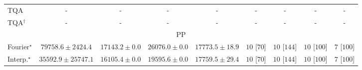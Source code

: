 \begin{tabular}{l|cccc|cccc|}
TQA & {\cellcolor[HTML]{000000}} \color[HTML]{F1F1F1} {\cellcolor{white}} \color{black} - & {\cellcolor[HTML]{000000}} \color[HTML]{F1F1F1} {\cellcolor{white}} \color{black} - & {\cellcolor[HTML]{000000}} \color[HTML]{F1F1F1} {\cellcolor{white}} \color{black} - & {\cellcolor[HTML]{000000}} \color[HTML]{F1F1F1} {\cellcolor{white}} \color{black} - & {\cellcolor[HTML]{000000}} \color[HTML]{F1F1F1} {\cellcolor{white}} \color{black} - & {\cellcolor[HTML]{000000}} \color[HTML]{F1F1F1} {\cellcolor{white}} \color{black} - & {\cellcolor[HTML]{000000}} \color[HTML]{F1F1F1} {\cellcolor{white}} \color{black} - & {\cellcolor[HTML]{000000}} \color[HTML]{F1F1F1} {\cellcolor{white}} \color{black} - \\
TQA$^\dagger$ & {\cellcolor[HTML]{000000}} \color[HTML]{F1F1F1} {\cellcolor{white}} \color{black} - & {\cellcolor[HTML]{000000}} \color[HTML]{F1F1F1} {\cellcolor{white}} \color{black} - & {\cellcolor[HTML]{000000}} \color[HTML]{F1F1F1} {\cellcolor{white}} \color{black} - & {\cellcolor[HTML]{000000}} \color[HTML]{F1F1F1} {\cellcolor{white}} \color{black} - & {\cellcolor[HTML]{000000}} \color[HTML]{F1F1F1} {\cellcolor{white}} \color{black} - & {\cellcolor[HTML]{000000}} \color[HTML]{F1F1F1} {\cellcolor{white}} \color{black} - & {\cellcolor[HTML]{000000}} \color[HTML]{F1F1F1} {\cellcolor{white}} \color{black} - & {\cellcolor[HTML]{000000}} \color[HTML]{F1F1F1} {\cellcolor{white}} \color{black} - \\
\cline{1-9}
\multicolumn{9}{c}{\rule{0pt}{8pt}PP} \\
\midrule
Fourier$^\star$ & {\cellcolor[HTML]{004529}} \color[HTML]{F1F1F1} $79758.6\pm 2424.4$ & {\cellcolor[HTML]{FBFED2}} \color[HTML]{000000} $17143.2\pm 0.0$ & {\cellcolor[HTML]{E7F6AD}} \color[HTML]{000000} $26076.0\pm 0.0$ & {\cellcolor[HTML]{FBFDCE}} \color[HTML]{000000} $17773.5\pm 18.9$ & {\cellcolor[HTML]{49006A}} \color[HTML]{F1F1F1} $10$ [$70$] & {\cellcolor[HTML]{49006A}} \color[HTML]{F1F1F1} $10$ [$144$] & {\cellcolor[HTML]{49006A}} \color[HTML]{F1F1F1} $10$ [$100$] & {\cellcolor[HTML]{CD238F}} \color[HTML]{F1F1F1} $7$ [$100$] \\
Interp.$^\star$ & {\cellcolor[HTML]{BCE395}} \color[HTML]{000000} $35592.9\pm 25747.1$ & {\cellcolor[HTML]{FCFED7}} \color[HTML]{000000} $16105.4\pm 0.0$ & {\cellcolor[HTML]{F9FDC4}} \color[HTML]{000000} $19595.6\pm 0.0$ & {\cellcolor[HTML]{FBFDCE}} \color[HTML]{000000} $17759.5\pm 29.4$ & {\cellcolor[HTML]{49006A}} \color[HTML]{F1F1F1} $10$ [$70$] & {\cellcolor[HTML]{49006A}} \color[HTML]{F1F1F1} $10$ [$144$] & {\cellcolor[HTML]{49006A}} \color[HTML]{F1F1F1} $10$ [$100$] & {\cellcolor[HTML]{CD238F}} \color[HTML]{F1F1F1} $7$ [$100$] \\

\end{tabular}
